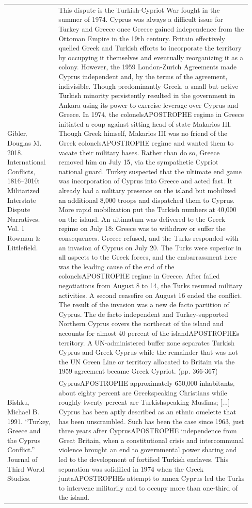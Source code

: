 {\begin{longtable}{p{}p{}}
Gibler, Douglas M. 2018. International Conflicts, 1816–2010: Militarized Interstate Dispute Narratives. Vol. 1 Rowman \& Littlefield. & This dispute is the Turkish-Cypriot War fought in the summer of 1974. Cyprus was always a difficult issue for Turkey and Greece once Greece gained independence from the Ottoman Empire in the 19th century. Britain effectively quelled Greek and Turkish efforts to incorporate the territory by occupying it themselves and eventually reorganizing it as a colony. However, the 1959 London-Zurich Agreements made Cyprus independent and, by the terms of the agreement, indivisible. Though predominantly Greek, a small but active Turkish minority persistently resulted in the government in Ankara using its power to exercise leverage over Cyprus and Greece. In 1974, the colonelsAPOSTROPHE regime in Greece initiated a coup against sitting head of state Makarios III. Though Greek himself, Makarios III was no friend of the Greek colonelsAPOSTROPHE regime and wanted them to vacate their military bases. Rather than do so, Greece removed him on July 15, via the sympathetic Cypriot national guard. Turkey suspected that the ultimate end game was incorporation of Cyprus into Greece and acted fast. It already had a military presence on the island but mobilized an additional 8,000 troops and dispatched them to Cyprus. More rapid mobilization put the Turkish numbers at 40,000 on the island. An ultimatum was delivered to the Greek regime on July 18: Greece was to withdraw or suffer the consequences. Greece refused, and the Turks responded with an invasion of Cyprus on July 20. The Turks were superior in all aspects to the Greek forces, and the embarrassment here was the leading cause of the end of the colonelsAPOSTROPHE regime in Greece. After failed negotiations from August 8 to 14, the Turks resumed military activities. A second ceasefire on August 16 ended the conflict. The result of the invasion was a new de facto partition of Cyprus. The de facto independent and Turkey-supported Northern Cyprus covers the northeast of the island and accounts for almost 40 percent of the islandAPOSTROPHEs territory. A UN-administered buffer zone separates Turkish Cyprus and Greek Cyprus while the remainder that was not the UN Green Line or territory allocated to Britain via the 1959 agreement became Greek Cypriot. (pp. 366-367)
\\
Bishku, Michael B. 1991. “Turkey, Greece and the Cyprus Conflict.” Journal of Third World Studies. & CyprusAPOSTROPHE approximately 650,000 inhabitants, about eighty percent are Greekspeaking Christians while roughly twenty percent are Turkishspeaking Muslims; [...] Cyprus has been aptly described as an ethnic omelette that has been unscrambled. Such has been the case since 1963, just three years after CyprusAPOSTROPHE independence from Great Britain, when a constitutional crisis and intercommunal violence brought an end to governmental power sharing and led to the development of fortified Turkish enclaves. This separation was solidified in 1974 when the Greek juntaAPOSTROPHEs attempt to annex Cyprus led the Turks to intervene militarily and to occupy more than one-third of the island.

\end{longtable}}
